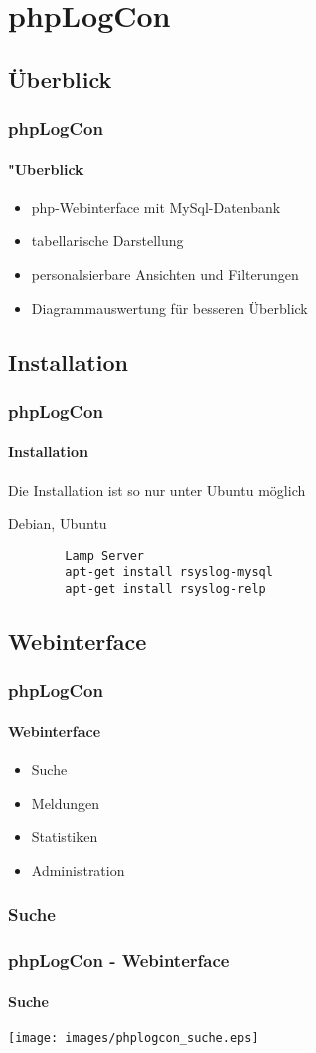 \section{phpLogCon}
\subsection{Überblick}
\begin{frame}
	\frametitle{phpLogCon}
	\framesubtitle{"Uberblick}
	\begin{itemize}
		\item php-Webinterface mit MySql-Datenbank
		\item tabellarische Darstellung
		\item personalsierbare Ansichten und Filterungen
		\item Diagrammauswertung für besseren Überblick
	\end{itemize}
\end{frame}

\subsection{Installation}
\begin{frame}[fragile]
	\frametitle{phpLogCon}
	\framesubtitle{Installation}
	Die Installation ist so nur unter Ubuntu möglich
	\begin{block}{Debian, Ubuntu}
	\begin{verbatim}
		Lamp Server
		apt-get install rsyslog-mysql
		apt-get install rsyslog-relp
	\end{verbatim}
	\end{block}
\end{frame}

\subsection{Webinterface}
\begin{frame}
	\frametitle{phpLogCon}
	\framesubtitle{Webinterface}
	\begin{itemize}
		\item Suche
		\item Meldungen
		\item Statistiken
		\item Administration
	\end{itemize}
\end{frame}

\subsubsection{Suche}
\begin{frame}
	\frametitle{phpLogCon - Webinterface}
	\framesubtitle{Suche}
	\begin{center}
		\texttt{[image: images/phplogcon\_suche.eps]}
	\end{center}
\end{frame}

